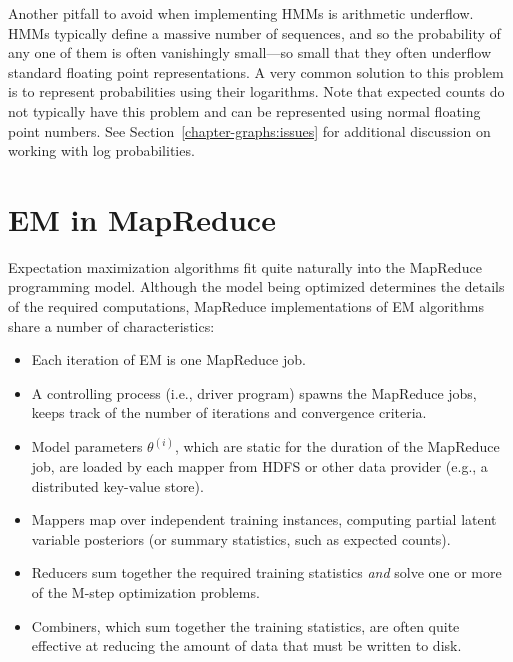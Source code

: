 Another pitfall to avoid when implementing HMMs is arithmetic
underflow.  HMMs typically define a massive number of sequences, and
so the probability of any one of them is often vanishingly small---so
small that they often underflow standard floating point
representations.  A very common solution to this problem is to
represent probabilities using their logarithms.  Note that expected
counts do not typically have this problem and can be represented using
normal floating point numbers.  See
Section~\ref{chapter-graphs:issues} for additional discussion on
working with log probabilities.

\section{EM in MapReduce}
\label{chapter6_mapreduce}

Expectation maximization algorithms fit quite naturally into the
MapReduce programming model.  Although the model being optimized
determines the details of the required computations, MapReduce
implementations of EM algorithms share a number of characteristics:

\begin{itemize}

\item Each iteration of EM is one MapReduce job.

\item A controlling process (i.e., driver program) spawns the
  MapReduce jobs, keeps track of the number of iterations and
  convergence criteria.

\item Model parameters $\theta^{(i)}$, which are static for the
  duration of the MapReduce job, are loaded by each mapper from HDFS
  or other data provider (e.g., a distributed key-value store).

\item Mappers map over independent training instances, computing
  partial latent variable posteriors (or summary statistics, such as
  expected counts).

\item Reducers sum together the required training statistics
  \emph{and} solve one or more of the M-step optimization problems.

\item Combiners, which sum together the training statistics, are often
  quite effective at reducing the amount of data that must be written
  to disk.

\end{itemize}

